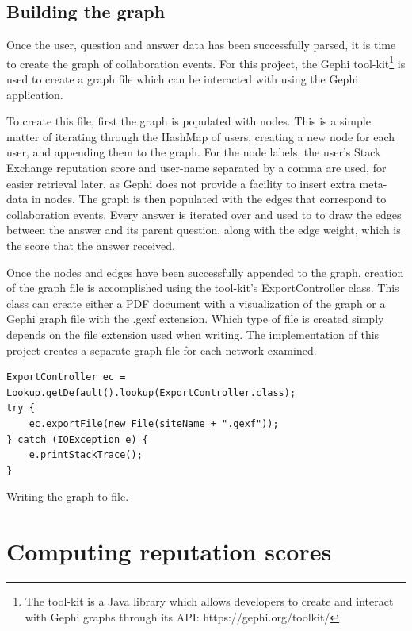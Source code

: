 \documentclass[]{final_report}
\begin{document}
\subsection{Building the graph}

Once the user, question and answer data has been successfully parsed, it is time to create the graph of collaboration events. For this project, the Gephi tool-kit\footnote{The tool-kit is a Java library which allows developers to create and interact with Gephi graphs through its API: https://gephi.org/toolkit/} is used to create a graph file which can be interacted with using the Gephi application.

To create this file, first the graph is populated with nodes. This is a simple matter of iterating through the HashMap of users, creating a new node for each user, and appending them to the graph. For the node labels, the user's Stack Exchange reputation score and user-name separated by a comma are used, for easier retrieval later, as Gephi does not provide a facility to insert extra meta-data in nodes. The graph is then populated with the edges that correspond to collaboration events. Every answer is iterated over and used to to draw the edges between the answer and its parent question, along with the edge weight, which is the score that the answer received. 

Once the nodes and edges have been successfully appended to the graph, creation of the graph file is accomplished using the tool-kit's ExportController class. This class can create either a PDF document with a visualization of the graph or a Gephi graph file with the .gexf extension. Which type of file is created simply depends on the file extension used when writing. The implementation of this project creates a separate graph file for each network examined.

\begin{program}
\begin{verbatim}
ExportController ec = Lookup.getDefault().lookup(ExportController.class);
try {
    ec.exportFile(new File(siteName + ".gexf"));
} catch (IOException e) {
    e.printStackTrace();
}
\end{verbatim}
\caption{Writing the graph to file.}
\end{program}

\section{Computing reputation scores}
\end{document}
